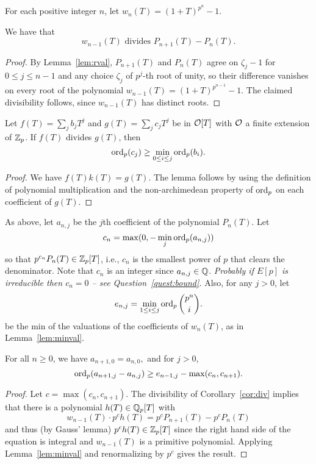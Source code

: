 
For each positive integer $n$, let $w_n(T) = (1+T)^{p^n}-1$.
\begin{corollary}\label{cor:div}
We have that
$$
w_{n-1}(T) \text{~divides~} P_{n+1}(T) - P_{n}(T).
$$
\end{corollary}
\begin{proof} 
By Lemma~\ref{lem:rval},
$P_{n+1}(T)$ and $P_{n}(T)$ agree on 
$\zeta_j-1$ for $0 \leq j \leq n-1$
and any choice $\zeta_j$ of $p^j$-th root of unity,
so their difference vanishes on every
root of the polynomial
$w_{n-1}(T) = (1+T)^{p^{n-1}} - 1$.
The claimed divisibility follows, since
$w_{n-1}(T)$ has distinct roots. 
\end{proof}

\begin{lemma}\label{lem:minval}
Let 
$f(T) = \sum_j b_j T^j$ and $g(T)=\sum_j c_j T^j$ 
be in $\mathcal{O}[T]$ with $\mathcal{O}$ a finite extension of $\mathbb{Z}_p$.  
If $f(T)$ divides $g(T)$, then 
$$
  \operatorname{ord}_p(c_j) \geq \min_{0 \leq i \leq j} \operatorname{ord}_p(b_i).
$$
\end{lemma}
\begin{proof}
We have $f(T)k(T) = g(T)$.
The lemma follows
by using the definition of polynomial
multiplication and the non-archimedean property of $\operatorname{ord}_p$
on each coefficient of $g(T)$.
\end{proof}

As above, let $a_{n,j}$ be the $j$th coefficient of 
the polynomial $P_n(T)$.
Let
$$
   c_n = \max(0, - \min_j \operatorname{ord}_p(a_{n,j}))
$$ 
so that $p^{c_n} P_{n}(T) \in \mathbb{Z}_p[T]$, i.e., $c_n$
is the smallest power of $p$ that clears the denominator.
Note that $c_n$ is an integer since $a_{n,j} \in \mathbb{Q}$.
{\em Probably if $E[p]$ is irreducible then $c_n=0$ -- see
Question~\ref{quest:bound}.}
Also, for any $j>0$,
let
$$
  e_{n,j} = \min_{1 \leq i \leq j} \operatorname{ord}_p \binom{p^n}{i}.
$$
be the min of the valuations of the coefficients of $w_{n}(T)$,
as in Lemma~\ref{lem:minval}.

\begin{proposition}\label{prop:padicerr}
For all $n\geq 0$, we have
$
  a_{n+1,0} = a_{n,0},
$
and for $j>0$,
$$
\operatorname{ord}_p(a_{n+1,j} - a_{n,j}) \geq  e_{n-1,j} - \max(c_{n}, c_{n+1}).
$$
\end{proposition}
\begin{proof}
Let $c = \max(c_{n},c_{n+1})$.
The divisibility of Corollary~\ref{cor:div} implies that there
is a polynomial $h(T)\in \mathbb{Q}_p[T]$ with 
$$
w_{n-1}(T) \cdot p^{c} h(T) = p^{c} P_{n+1}(T) - p^{c}P_{n}(T)
$$
and thus (by Gauss' lemma) $p^{c} h(T) \in \mathbb{Z}_p[T]$ 
since the right hand side of the equation is integral and $w_{n-1}(T)$ 
is a primitive polynomial.
Applying Lemma~\ref{lem:minval} and renormalizing by $p^{c}$
gives the result.
\end{proof}

